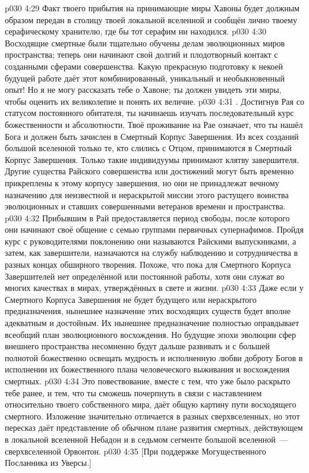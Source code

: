 \vs p030 4:29 Факт твоего прибытия на принимающие миры Хавоны будет должным образом передан в столицу твоей локальной вселенной и сообщён лично твоему серафическому хранителю, где бы тот серафим ни находился.
\vs p030 4:30 Восходящие смертные были тщательно обучены делам эволюционных миров пространства; теперь они начинают свой долгий и плодотворный контакт с созданными сферами совершенства. Какую прекрасную подготовку к некоей будущей работе даёт этот комбинированный, уникальный и необыкновенный опыт! Но я не могу рассказать тебе о Хавоне; ты должен увидеть эти миры, чтобы оценить их великолепие и понять их величие.
\vs p030 4:31 . Достигнув Рая со статусом постоянного обитателя, ты начинаешь изучать последовательный курс божественности и абсолютности. Твоё проживание на Рае означает, что ты нашёл Бога и должен быть зачислен в Смертный Корпус Завершения. Из всех созданий большой вселенной только те, кто слились с Отцом, принимаются в Смертный Корпус Завершения. Только такие индивидуумы принимают клятву завершителя. Другие существа Райского совершенства или достижений могут быть временно прикреплены к этому корпусу завершения, но они не принадлежат вечному назначению для неизвестной и нераскрытой миссии этого растущего воинства эволюционных и ставших совершенными ветеранов времени и пространства.
\vs p030 4:32 Прибывшим в Рай предоставляется период свободы, после которого они начинают своё общение с семью группами первичных супернафимов. Пройдя курс с руководителями поклонению они называются Райскими выпускниками, а затем, как завершители, назначаются на службу наблюдению и сотрудничества в разных концах обширного творения. Похоже, что пока для Смертного Корпуса Завершителей нет определённой или постоянной работы, хотя они служат во многих качествах в мирах, утверждённых в свете и жизни.
\vs p030 4:33 Даже если у Смертного Корпуса Завершения не будет будущего или нераскрытого предназначения, нынешнее назначение этих восходящих существ будет вполне адекватным и достойным. Их нынешнее предназначение полностью оправдывает всеобщий план эволюционного восхождения. Но будущие эпохи эволюции сфер внешнего пространства несомненно будут дальше развивать и с большей полнотой божественно освещать мудрость и исполненную любви доброту Богов в исполнении их божественного плана человеческого выживания и восхождения смертных.
\vs p030 4:34 \pc Это повествование, вместе с тем, что уже было раскрыто тебе ранее, и тем, что ты сможешь почерпнуть в связи с наставлением относительно твоего собственного мира, даёт общую картину пути восходящего смертного. Изложение значительно отличается в разных сверхвселенных, но этот пересказ даёт представление об обычном плане развития смертных, действующем в локальной вселенной Небадон и в седьмом сегменте большой вселенной~--- сверхвселенной Орвонтон.
\vsetoff
\vs p030 4:35 [При поддержке Могущественного Посланника из Уверсы.]
\quizlink
